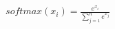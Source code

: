 \documentclass[preview]{standalone}
\begin{document}
\begin{align*}
softmax(x_{i}) = \frac{e^{x_{i}}}{\sum_{j=1}^{n} e^{x_{j}}}
\end{align*}
\end{document}
